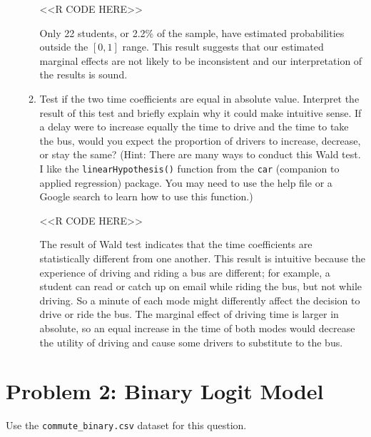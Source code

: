 \documentclass[11pt,letterpaper]{article}
\begin{document}
\begin{enumerate}[label=\alph*., leftmargin=*]
\begin{enumerate}[label=\roman*.]
		<<R CODE HERE>>

		Only 22 students, or 2.2\% of the sample, have estimated probabilities outside the $[0, 1]$ range. This result suggests that our estimated marginal effects are not likely to be inconsistent and our interpretation of the results is sound.

		\item Test if the two time coefficients are equal in absolute value. Interpret the result of this test and briefly explain why it could make intuitive sense. If a delay were to increase equally the time to drive and the time to take the bus, would you expect the proportion of drivers to increase, decrease, or stay the same? (Hint: There are many ways to conduct this Wald test. I like the \texttt{linearHypothesis()} function from the \texttt{car} (companion to applied regression) package. You may need to use the help file or a Google search to learn how to use this function.) 

		<<R CODE HERE>>

		The result of Wald test indicates that the time coefficients are statistically different from one another. This result is intuitive because the experience of driving and riding a bus are different; for example, a student can read or catch up on email while riding the bus, but not while driving. So a minute of each mode might differently affect the decision to drive or ride the bus. The marginal effect of driving time is larger in absolute, so an equal increase in the time of both modes would decrease the utility of driving and cause some drivers to substitute to the bus.
	\end{enumerate}
\end{enumerate}

\section*{Problem 2: Binary Logit Model}

Use the \texttt{commute\_binary.csv} dataset for this question.
\end{document}
